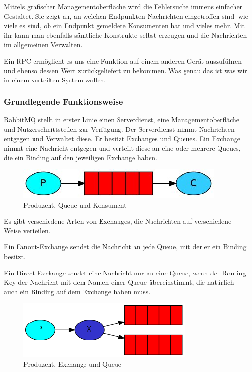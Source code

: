 \documentclass[12pt,a4paper]{scrartcl}
\begin{document}
Mittels grafischer Managementoberfläche wird die Fehlersuche immens einfacher Gestaltet. Sie zeigt an, an welchen Endpunkten Nachrichten eingetroffen sind, wie viele es sind, ob ein Endpunkt gemeldete Konsumenten hat und vieles mehr. Mit ihr kann man ebenfalls sämtliche Konstrukte selbst erzeugen und die Nachrichten im allgemeinen Verwalten. 

Ein RPC ermöglicht es uns eine Funktion auf einem anderen Gerät auszuführen und ebenso dessen Wert zurückgeliefert zu bekommen. Was genau das ist was wir in einem verteilten System wollen.

\subsubsection{Grundlegende Funktionsweise}

RabbitMQ stellt in erster Linie einen Serverdienst, eine Managementoberfläche und Nutzerschnittstellen zur Verfügung. Der Serverdienst nimmt Nachrichten entgegen und Verwaltet diese. 
Er besitzt Exchanges und Queues. Ein Exchange nimmt eine Nachricht entgegen und verteilt diese an eine oder mehrere Queues, die ein Binding auf den jeweiligen Exchange haben. 

\begin{figure}[h!]
	\centering
	\includegraphics[scale=1]{P2C.jpg}
	\caption[https://www.rabbitmq.com/tutorials/tutorial-one-dotnet.html]{Produzent, Queue und Konsument}
\end{figure}

Es gibt verschiedene Arten von Exchanges, die Nachrichten auf verschiedene Weise verteilen. 

Ein Fanout-Exchange sendet die Nachricht an jede Queue, mit der er ein Binding besitzt. 

Ein Direct-Exchange sendet eine Nachricht nur an eine Queue, wenn der Routing-Key der Nachricht mit dem Namen einer Queue übereinstimmt, die natürlich auch ein Binding auf dem Exchange haben muss.

\begin{figure}[h!]
	\centering
	\includegraphics[scale=1.65]{exchanges.png}
	\caption[https://www.rabbitmq.com/tutorials/tutorial-three-dotnet.html]{Produzent, Exchange und Queue}
\end{figure}
\end{document}
